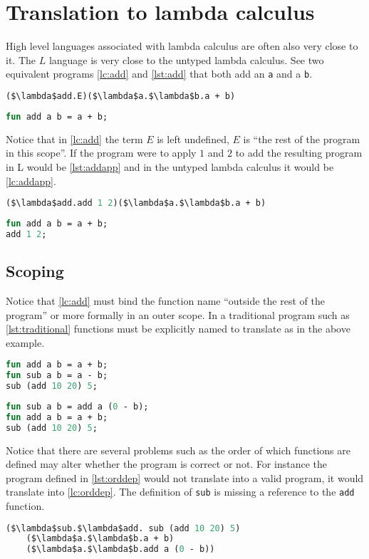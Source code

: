 \documentclass[11pt,oneside,a4paper]{report}
\begin{document}
\section{Translation to lambda calculus}
High level languages associated with lambda calculus are often also very close to it.
The $L$ language is very close to the untyped lambda calculus.
See two equivalent programs \autoref{lc:add} and \autoref{lst:add} that both add an \texttt{a} and a \texttt{b}.
\begin{lstlisting}[language=ML,caption={Add function in lambda calculus},label={lc:add},mathescape=true]
($\lambda$add.E)($\lambda$a.$\lambda$b.a + b)
\end{lstlisting}
\begin{lstlisting}[language=ML,caption={Add function in L},label={lst:add}]
fun add a b = a + b;
\end{lstlisting}
Notice that in \autoref{lc:add} the term $E$ is left undefined, $E$ is ``the rest of the program in this scope''.
If the program were to apply $1$ and $2$ to add the resulting program in L would be \autoref{lst:addapp} and in the untyped lambda calculus it would be \autoref{lc:addapp}.
\begin{lstlisting}[language=ML,caption={Add function in lambda calculus},label={lc:addapp},mathescape=true]
($\lambda$add.add 1 2)($\lambda$a.$\lambda$b.a + b)
\end{lstlisting}
\begin{lstlisting}[language=ML,caption={Add function applied},label={lst:addapp}]
fun add a b = a + b;
add 1 2;
\end{lstlisting}

\subsection{Scoping}\label{scoping}
Notice that \autoref{lc:add} must bind the function name ``outside the rest of the program'' or more formally in an outer scope.
In a traditional program such as \autoref{lst:traditional} functions must be explicitly named to translate as in the above example.
\begin{lstlisting}[language=ML,caption={A traditional program},label={lst:traditional}]
fun add a b = a + b;
fun sub a b = a - b;
sub (add 10 20) 5;
\end{lstlisting}
\begin{lstlisting}[language=ML,caption={An order dependent program},label={lst:orddep}]
fun sub a b = add a (0 - b);
fun add a b = a + b;
sub (add 10 20) 5;
\end{lstlisting}
Notice that there are several problems such as the order of which functions are defined may alter whether the program is correct or not.
For instance the program defined in \autoref{lst:orddep} would not translate into a valid program, it would translate into \autoref{lc:orddep}.
The definition of \texttt{sub} is missing a reference to the \texttt{add} function.
\begin{lstlisting}[language=ML,caption={Add function in lambda calculus},label={lc:orddep},mathescape=true]
($\lambda$sub.$\lambda$add. sub (add 10 20) 5) 
    ($\lambda$a.$\lambda$b.a + b) 
    ($\lambda$a.$\lambda$b.add a (0 - b))
\end{lstlisting}
\end{document}
